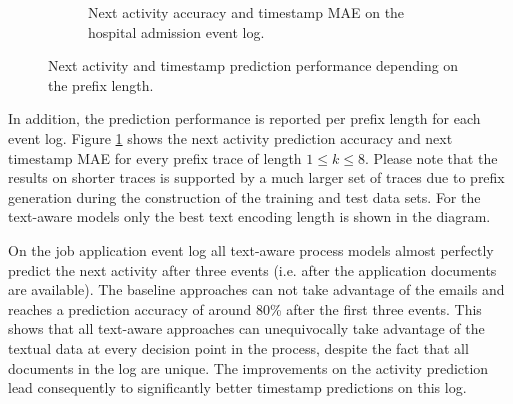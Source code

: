 \begin{figure}[!htbp]
\begin{subfigure}{\textwidth}
		\caption{Next activity accuracy and timestamp MAE on the hospital admission event log.}
	\end{subfigure}
	\caption[Next activity and timestamp prediction performance depending on the prefix length]{Next activity and timestamp prediction performance depending on the prefix length.}
	\label{fig:next-activity-prefix}
\end{figure}

In addition, the prediction performance is reported per prefix length for each event log.
Figure \ref{fig:next-activity-prefix} shows the next activity prediction accuracy and next timestamp MAE for every prefix trace of length $1 \leq k \leq 8$.
Please note that the results on shorter traces is supported by a much larger set of traces due to prefix generation during the construction of the training and test data sets.
For the text-aware models only the best text encoding length is shown in the diagram.

On the job application event log all text-aware process models almost perfectly predict the next activity after three events (i.e. after the application documents are available).
The baseline approaches can not take advantage of the emails and reaches a prediction accuracy of around 80\% after the first three events.
This shows that all text-aware approaches can unequivocally take advantage of the textual data at every decision point in the process, despite the fact that all documents in the log are unique.
The improvements on the activity prediction lead consequently to significantly better timestamp predictions on this log.


